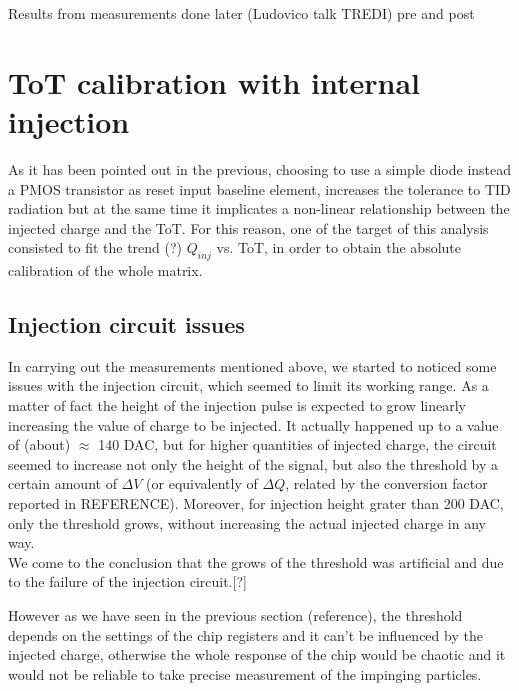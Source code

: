 Results from measurements done later (Ludovico talk TREDI) pre and post



\section{ToT calibration with internal injection}



As it has been pointed out in the previous, choosing to use a simple diode instead a PMOS transistor as reset input baseline element, increases the tolerance to TID radiation but at the same time it implicates a non-linear relationship between the injected charge and the ToT.  For this reason, one of the target of this analysis consisted to fit the trend (?) $Q_{inj}$ vs. ToT, in order to obtain the absolute calibration of the whole matrix.


\subsection{Injection circuit issues} \label{inj_issue}


In carrying out the measurements mentioned above, we started to noticed some issues with the injection circuit, which seemed to limit its working range. As a matter of fact the height of the injection pulse is expected to grow linearly increasing the value of charge to be injected.
It actually happened up to a value of (about) $\approx$ 140 DAC, but for higher quantities of injected charge, the circuit seemed to increase not only the height of the signal, but also the threshold by a certain amount of $\Delta V$ (or equivalently of $\Delta Q$, related by the conversion factor reported in REFERENCE). Moreover, for injection height grater than 200 DAC, only the threshold grows, without increasing the actual injected charge in any way.\\
We come to the conclusion that the grows of the threshold was artificial and due to the failure of the injection circuit.[?]

However as we have seen in the previous section (reference), the threshold depends on the settings of the chip registers and it can't be influenced by the injected charge, otherwise the whole response of the chip would be chaotic and it would not be reliable to take precise measurement of the impinging particles. \\

